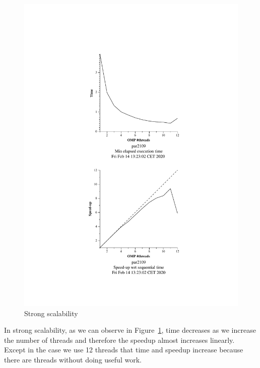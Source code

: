 \begin{figure}[H]%
    \caption{Strong scalability}%
    \label{fig:strong}
    \centering
    \includegraphics[width=\textwidth]{./data/pi/pi_omp-1000000000-1-12-3-strong-boada-2.pdf}
\end{figure}

In strong scalability, as we can observe in Figure~\ref{fig:strong}, time decreases as we increase the number of threads and therefore the speedup almost increases linearly. Except in the case we use 12 threads that time and speedup increase because there are threads without doing useful work.


